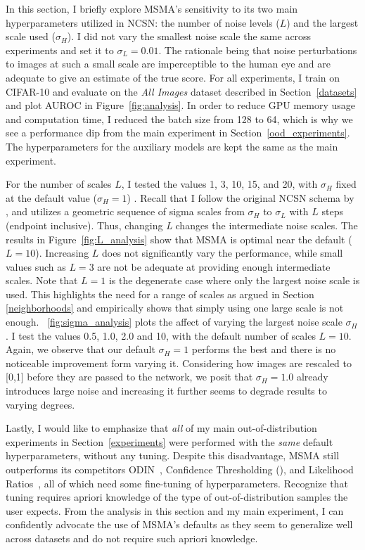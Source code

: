 In this section, I briefly explore MSMA's sensitivity to its two main hyperparameters utilized in NCSN: the number of noise levels ($L$) and the largest scale used ($\sigma_H$). I did not vary the smallest noise scale the same across experiments and set it to $\sigma_L=0.01$. The rationale being that noise perturbations to images at such a small scale are imperceptible to the human eye and are adequate to give an estimate of the true score. For all experiments, I train on CIFAR-10 and evaluate on the \emph{All Images} dataset described in Section~\ref{datasets} and plot AUROC in Figure~\ref{fig:analysis}. In order to reduce GPU memory usage and computation time, I reduced the batch size from 128 to 64, which is why we see a performance dip from the main experiment in Section~\ref{ood_experiments}. The hyperparameters for the auxiliary models are kept the same as the main experiment.

For the number of scales $L$, I tested the values 1, 3, 10, 15, and 20, with $\sigma_H$ fixed at the default value ($\sigma_H=1$) . Recall that I follow the original NCSN schema by \cite{Song2019}, and utilizes a geometric sequence of sigma scales from $\sigma_H$ to $\sigma_L$ with $L$ steps (endpoint inclusive). Thus, changing \emph{L} changes the intermediate noise scales. The results in Figure~\ref{fig:L_analysis} show that MSMA is optimal near the default ($L=10$). Increasing $L$ does not significantly vary the performance, while small values such as $L=3$ are not be adequate at providing enough intermediate scales. Note that $L=1$ is the degenerate case where only the largest noise scale is used. This highlights the need for a range of scales as argued in Section \ref{neighborhoods} and empirically shows that simply using one large scale is not enough. \figurename{~\ref{fig:sigma_analysis}} plots the affect of varying the largest noise scale $\sigma_H$. I test the values 0.5, 1.0, 2.0 and 10, with the default number of scales $L=10$. Again, we observe that our default $\sigma_H=1$ performs the best and there is no noticeable improvement form varying it. Considering how images are rescaled to [0,1] before they are passed to the network, we posit that $\sigma_H=1.0$ already introduces large noise and increasing it further seems to degrade results to varying degrees. 

Lastly, I would like to emphasize that \emph{all} of my main out-of-distribution experiments in Section~\ref{experiments} were performed with the \emph{same} default hyperparameters, without any tuning. Despite this disadvantage, MSMA still outperforms its competitors ODIN~\cite{Liang2017}, Confidence Thresholding (\cite{Devries}), and Likelihood Ratios~\cite{Ren2019}, all of which need some fine-tuning of hyperparameters. Recognize that tuning requires apriori knowledge of the type of out-of-distribution samples the user expects. From the analysis in this section and my main experiment, I can confidently advocate the use of MSMA's defaults as they seem to generalize well across datasets and do not require such apriori knowledge. 

